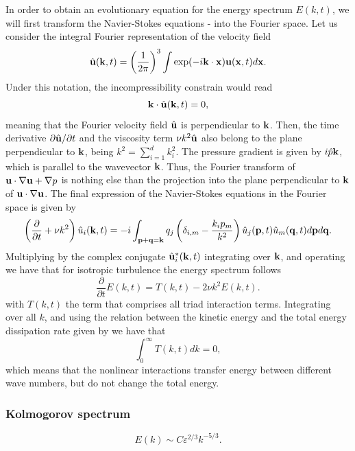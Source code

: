 In order to obtain an evolutionary equation for the energy spectrum $E(k,t)$, we will first transform the Navier-Stokes equations - into the Fourier space. Let us consider the integral Fourier representation of the velocity field
$$\hat{{\bf u}}({\bf k},t)=\left(\frac{1}{2\pi}\right)^3\int\exp(-i{\bf k}\cdot{\bf x}){\bf u}({\bf x},t)d{\bf x}.$$
Under this notation, the incompressibility constrain  would read
$${\bf k}\cdot\hat{{\bf u}}({\bf k},t)=0,$$
meaning that the Fourier velocity field $\hat{{\bf u}}$ is perpendicular to ${\bf k}$. Then, the time derivative $\partial\hat{{\bf u}}/\partial t$ and the viscosity term $\nu k^2\hat{{\bf u}}$ also belong to the plane perpendicular to ${\bf k}$, being $k^2=\sum_{i=1}^dk_i^2$. The pressure gradient is given by $i\hat{p}{\bf k}$, which is parallel to the wavevector ${\bf k}$. Thus, the Fourier transform of ${\bf u}\cdot\nabla{\bf u}+\nabla p$ is nothing else than the projection into the plane perpendicular to ${\bf k}$ of ${\bf u}\cdot\nabla{\bf u}$. The final expression of the Navier-Stokes equations in the Fourier space is given by
\begin{equation}
\label{eq-NS_strong_fourier}
\left(\frac{\partial}{\partial t}+\nu k^2\right)\hat{u}_i({\bf k},t)=-i\int_{\mathbf{p}+\mathbf{q}={\bf k}}q_j\left(\delta_{i,m}-\frac{k_ip_m}{k^2}\right)\hat{u}_j(\mathbf{p},t)\hat{u}_m(\mathbf{q},t)d\mathbf{p}d\mathbf{q}.
\end{equation}
Multiplying  by the complex conjugate $\hat{{\bf u}}_i^*({\bf k},t)$ integrating over ${\bf k}$, and operating we have that for isotropic turbulence the energy spectrum follows
\begin{equation}
\label{eq-energy_fourier}
\frac{\partial}{\partial t}E(k,t)=T(k,t)-2\nu k^2E(k,t).
\end{equation}
with $T(k,t)$ the term that comprises all triad interaction terms. Integrating over all $k$, and using the relation between the kinetic energy and the total energy dissipation rate given by  we have that
$$\int_0^\infty T(k,t)dk=0,$$
which means that the nonlinear interactions transfer energy between different wave numbers, but do not change the total energy.

\subsubsection{Kolmogorov spectrum}
\label{subsubsec-Kolmogorov_spectrum}
\begin{equation}
\label{eq-kolmogorov_spectrum}
E(k)\sim C\varepsilon^{2/3}k^{-5/3}.
\end{equation}

